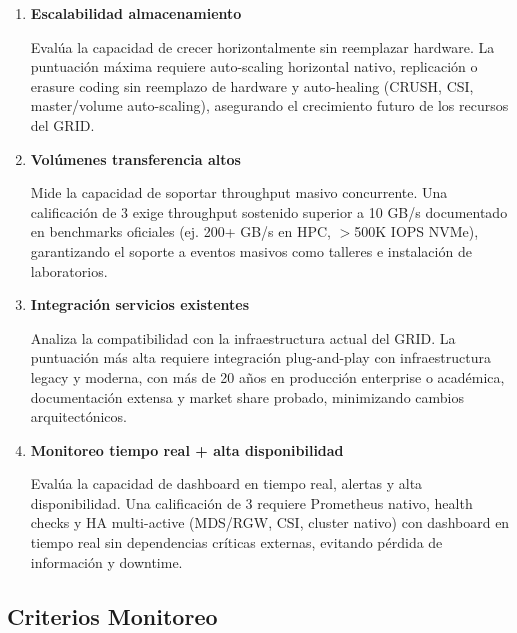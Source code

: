 \begin{enumerate}[resume*=criterios]
  \item \textbf{Escalabilidad almacenamiento}

  Evalúa la capacidad de crecer horizontalmente sin reemplazar hardware. La puntuación máxima requiere auto-scaling horizontal nativo, replicación o erasure coding sin reemplazo de hardware y auto-healing (CRUSH, CSI, master/volume auto-scaling), asegurando el crecimiento futuro de los recursos del GRID.

  \item \textbf{Volúmenes transferencia altos}

  Mide la capacidad de soportar throughput masivo concurrente. Una calificación de 3 exige throughput sostenido superior a 10 GB/s documentado en benchmarks oficiales (ej. 200+ GB/s en HPC, $>$500K IOPS NVMe), garantizando el soporte a eventos masivos como talleres e instalación de laboratorios.

  \item \textbf{Integración servicios existentes}

  Analiza la compatibilidad con la infraestructura actual del GRID. La puntuación más alta requiere integración plug-and-play con infraestructura legacy y moderna, con más de 20 años en producción enterprise o académica, documentación extensa y market share probado, minimizando cambios arquitectónicos.

  \item \textbf{Monitoreo tiempo real + alta disponibilidad}

  Evalúa la capacidad de dashboard en tiempo real, alertas y alta disponibilidad. Una calificación de 3 requiere Prometheus nativo, health checks y HA multi-active (MDS/RGW, CSI, cluster nativo) con dashboard en tiempo real sin dependencias críticas externas, evitando pérdida de información y downtime.

\end{enumerate}

\subsection{Criterios Monitoreo}

